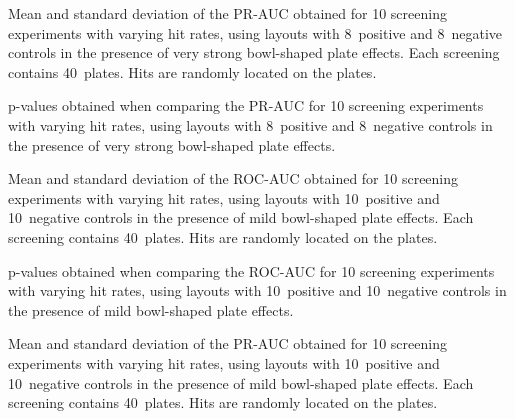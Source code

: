 \begin{table}[p]
    \centering
    \small
    
    \caption{Mean and standard deviation of the PR-AUC obtained for 10 screening experiments with varying hit rates, using layouts with 8~positive and 8~negative controls in the presence of very strong bowl-shaped plate effects. Each screening contains 40~plates. Hits are randomly located on the plates.}
    \label{tab:screening-pr_8-8-0.2}
\end{table}

\begin{table}[p]
    \centering
    \small
    
    \caption{p-values obtained when comparing the PR-AUC for 10 screening experiments with varying hit rates, using layouts with 8~positive and 8~negative controls in the presence of very strong bowl-shaped plate effects.}
    \label{tab:screening-pr_pvalues-8-8-0.2}
\end{table}

\begin{table}[p]
    \centering
    \small
    
    \caption{Mean and standard deviation of the ROC-AUC obtained for 10 screening experiments with varying hit rates, using layouts with 10~positive and 10~negative controls in the presence of mild bowl-shaped plate effects. Each screening contains 40~plates. Hits are randomly located on the plates.}
    \label{tab:screening-roc_10-10-0.06}
\end{table}

\begin{table}[p]
    \centering
    \small
    
    \caption{p-values obtained when comparing the ROC-AUC for 10 screening experiments with varying hit rates, using layouts with 10~positive and 10~negative controls in the presence of mild bowl-shaped plate effects.}
    \label{tab:screening-roc_pvalues-10-10-0.06}
\end{table}

\begin{table}[p]
    \centering
    \small
    
    \caption{Mean and standard deviation of the PR-AUC obtained for 10 screening experiments with varying hit rates, using layouts with 10~positive and 10~negative controls in the presence of mild bowl-shaped plate effects. Each screening contains 40~plates. Hits are randomly located on the plates.}
    \label{tab:screening-pr_10-10-0.06}
\end{table}

